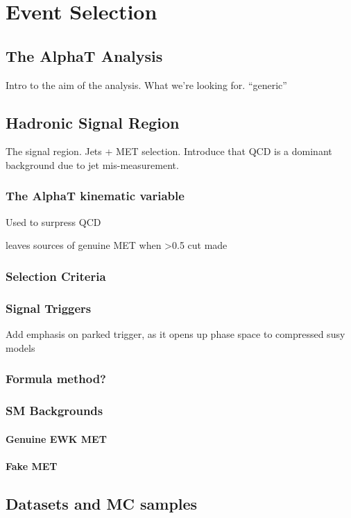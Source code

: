 \chapter{Event Selection}

\ifpdf
    \graphicspath{{Chapter5/Figs/Raster/}{Chapter5/Figs/PDF/}{Chapter5/Figs/}}
\else
    \graphicspath{{Chapter5/Figs/Vector/}{Chapter5/Figs/}}
\fi


\section{The AlphaT Analysis}  %
\label{sec:selection_analysis_overview}

Intro to the aim of the analysis. What we're looking for. ``generic''

\section{Hadronic Signal Region}
\label{sec:selection_hadronic}
The signal region. Jets + MET selection.
Introduce that QCD is a dominant background due to jet mis-measurement.

\subsection{The AlphaT kinematic variable}
Used to surpress QCD

leaves sources of genuine MET when >0.5 cut made

\subsection{Selection Criteria}

\subsection{Signal Triggers}

Add emphasis on parked trigger, as it opens up phase space to compressed susy models

\subsection{Formula method?}

\subsection{SM Backgrounds}
\subsubsection{Genuine EWK MET}
\subsubsection{Fake MET}



\section{Datasets and MC samples}